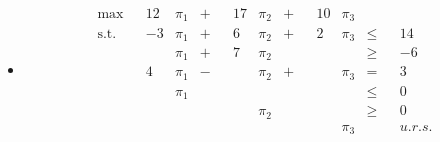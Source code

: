 \documentclass{article}
\begin{document}
	\begin{itemize}
		\item [1.]
		\begin{equation*}
			\begin{aligned}
				\text{max}&&12&\pi_1&+&&17&\pi_2&+&&10&\pi_3&&&\\
				\text{s.t.}&&-3&\pi_1&+&&6&\pi_2&+&&2&\pi_3&\leq&&14\\
				&&&\pi_1&+&&7&\pi_2&&&&&\geq&&-6\\
				&&4&\pi_1&-&&&\pi_2&+&&&\pi_3&=&&3\\
				&&&\pi_1&&&&&&&&&\leq&&0\\
				&&&&&&&\pi_2&&&&&\geq&&0\\
				&&&&&&&&&&&\pi_3&&&u.r.s.
			\end{aligned}
		\end{equation*}
	\end{itemize}
\end{document}
